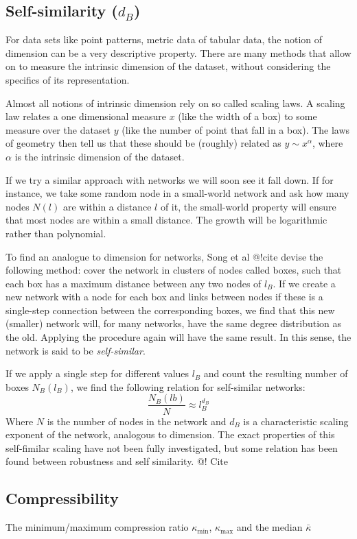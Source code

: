 \documentclass{article}
\theoremstyle{definition}
\begin{document}
\subsection*{Self-similarity ($d_B$)}

For data sets like point patterns, metric data of tabular data, the notion of dimension can be a very descriptive property. There are many methods that allow on to measure the intrinsic dimension of the dataset, without considering the specifics of its representation. 

Almost all notions of intrinsic dimension rely on so called scaling laws. A scaling law relates a one dimensional measure $x$ (like the width of a box) to some measure over the dataset $y$ (like the number of point that fall in a box). The laws of geometry then tell us that these should be (roughly) related as $y \sim x^\alpha$, where $\alpha$ is the intrinsic dimension of the dataset.

If we try a similar approach with networks we will soon see it fall down. If for instance, we take some random node in a small-world network and ask how many nodes $N(l)$ are within a distance $l$ of it, the small-world property will ensure that most nodes are within a small distance. The growth will be logarithmic rather than polynomial.

To find an analogue to dimension for networks, Song et al @!cite devise the following method: cover the network in clusters of nodes called boxes, such that each box has a maximum distance between any two nodes of $l_B$. If we create a new network with a node for each box and links between nodes if these is a single-step connection between the corresponding boxes, we find that this new (smaller) network will, for many networks, have the same degree distribution as the old. Applying the procedure again will have the same result. In this sense, the network is said to be \emph{self-similar}.

If we apply a single step for different values $l_B$ and count the resulting number of boxes $N_B(l_B)$, we find the following relation for self-similar networks:
\[
\frac{N_B(lb)}{N} \approx l_B^{d_B}
\]
Where $N$ is the number of nodes in the network and $d_B$ is a characteristic scaling exponent of the network, analogous to dimension. The exact properties of this self-fimilar scaling have not been fully investigated, but some relation has been found between robustness and self similarity. @! Cite


\subsection*{Compressibility}
The minimum/maximum compression ratio $\kappa_{\mbox{min}}$, $\kappa_{\mbox{max}}$ and the median $ \bar{\kappa}$
\end{document}
